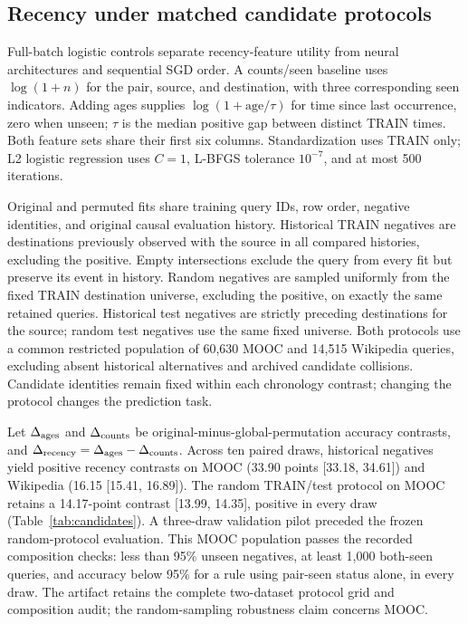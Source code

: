 \documentclass[sigconf,anonymous,review]{acmart}
\begin{document}
\subsection{Recency under matched candidate protocols}
Full-batch logistic controls separate recency-feature utility from neural architectures and sequential SGD order. A counts/seen baseline uses $\log(1+n)$ for the pair, source, and destination, with three corresponding seen indicators. Adding ages supplies $\log(1+\mathrm{age}/\tau)$ for time since last occurrence, zero when unseen; $\tau$ is the median positive gap between distinct TRAIN times. Both feature sets share their first six columns. Standardization uses TRAIN only; L2 logistic regression uses $C=1$, L-BFGS tolerance $10^{-7}$, and at most 500 iterations.

Original and permuted fits share training query IDs, row order, negative identities, and original causal evaluation history. Historical TRAIN negatives are destinations previously observed with the source in all compared histories, excluding the positive. Empty intersections exclude the query from every fit but preserve its event in history. Random negatives are sampled uniformly from the fixed TRAIN destination universe, excluding the positive, on exactly the same retained queries. Historical test negatives are strictly preceding destinations for the source; random test negatives use the same fixed universe. Both protocols use a common restricted population of 60,630 MOOC and 14,515 Wikipedia queries, excluding absent historical alternatives and archived candidate collisions. Candidate identities remain fixed within each chronology contrast; changing the protocol changes the prediction task.

Let $\Delta_{\rm ages}$ and $\Delta_{\rm counts}$ be original-minus-global-permutation accuracy contrasts, and $\Delta_{\rm recency}=\Delta_{\rm ages}-\Delta_{\rm counts}$. Across ten paired draws, historical negatives yield positive recency contrasts on MOOC (33.90 points [33.18, 34.61]) and Wikipedia (16.15 [15.41, 16.89]). The random TRAIN/test protocol on MOOC retains a 14.17-point contrast [13.99, 14.35], positive in every draw (Table~\ref{tab:candidates}). A three-draw validation pilot preceded the frozen random-protocol evaluation. This MOOC population passes the recorded composition checks: less than 95\% unseen negatives, at least 1,000 both-seen queries, and accuracy below 95\% for a rule using pair-seen status alone, in every draw. The artifact retains the complete two-dataset protocol grid and composition audit; the random-sampling robustness claim concerns MOOC.
\end{document}
